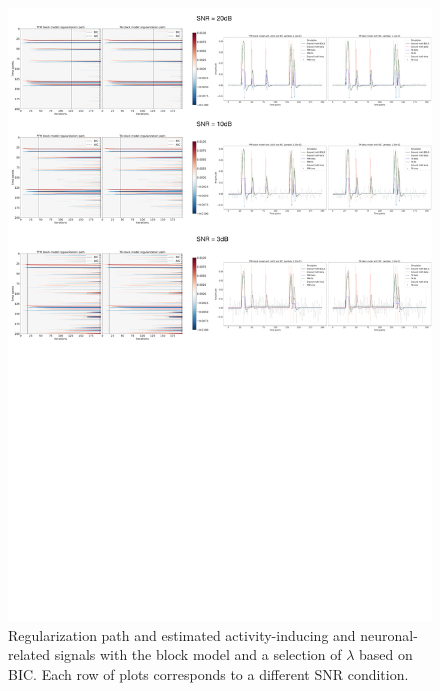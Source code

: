 \begin{figure}[t!]
    \begin{center}
        \includegraphics[width=\textwidth]{figures/regpath_block.pdf}
    \end{center}
    \caption{Regularization path and estimated activity-inducing and neuronal-related signals with the block model and a selection of \(\lambda\) based on BIC. Each row of plots corresponds to a different SNR condition.}
\label{fig:path_block}
\end{figure}

